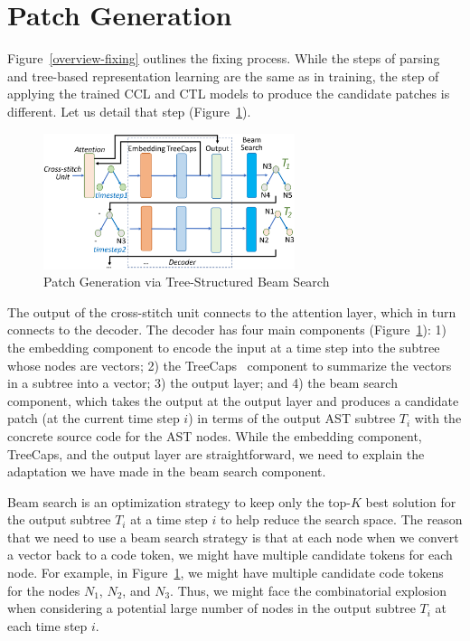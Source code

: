 \section{Patch Generation}
\label{sec:patch-gen}

Figure~\ref{overview-fixing} outlines the fixing process. While the
steps of parsing and tree-based representation learning are the same
as in training, the step of applying the trained CCL and
CTL models to produce the candidate patches is different. Let us
detail that step (Figure~\ref{fig:patch-gen}).

\begin{figure}[t]
	\centering
	\includegraphics[width=2.9in]{graphs/beam-search.png}
        \vspace{-3pt}
	\caption{Patch Generation via Tree-Structured Beam Search}
	\label{fig:patch-gen}
\end{figure}

The output of the cross-stitch unit connects to the attention layer,
which in turn connects to the decoder. The decoder has four main
components (Figure~\ref{fig:patch-gen}): 1) the embedding
component to encode the input at a time step into the subtree whose
nodes are vectors; 2) the TreeCaps~\cite{bui2021treecaps} component to
summarize the vectors in a subtree into a vector; 3) the output layer;
and 4) the beam search component, which takes the output at the output
layer and produces a candidate patch (at the current time step $i$) in
terms of the output AST subtree $T_i$ with the concrete source code
for the AST nodes. While the embedding component, TreeCaps, and the
output layer are straightforward, we need to explain the adaptation we
have made in the beam search component.

Beam search is an optimization strategy to keep only the top-$K$ best
solution for the output subtree $T_i$ at a time step $i$ to help
reduce the search space. The reason that we need to use a beam search
strategy is that at each node when we convert a vector back to a code
token, we might have multiple candidate tokens for each node. For
example, in Figure~\ref{fig:patch-gen}, we might have multiple
candidate code tokens for the nodes $N_1$, $N_2$, and $N_3$. Thus, we
might face the combinatorial explosion when considering a potential
large number of nodes in the output subtree $T_i$ at each time step
$i$.

